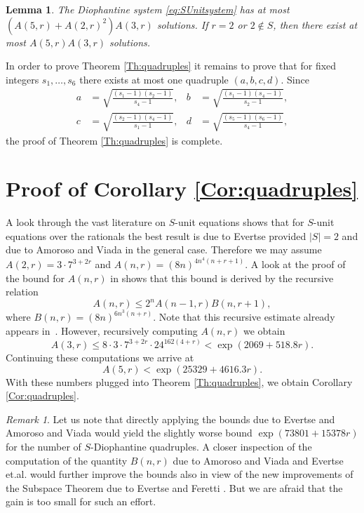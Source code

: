 \documentclass{amsart}
\newtheorem{lemma}{Lemma}
\theoremstyle{remark}
\newtheorem{remark}{Remark}
\begin{document}
\begin{lemma}
The Diophantine system \eqref{eq:SUnitsystem} has at most $(A(5,r)+A(2,r)^2)A(3,r)$ solutions. If $r=2$ or $2\not \in S$, then there exist at most 
$A(5,r)A(3,r)$ solutions.
\end{lemma}

In order to prove Theorem \ref{Th:quadruples} it remains to prove that for fixed integers $s_1,\dots,s_6$ there exists at most one quadruple $(a,b,c,d)$. Since
\begin{align*}
a&=\sqrt{\frac{(s_1-1)(s_2-1)}{s_4-1}},& b&=\sqrt{\frac{(s_1-1)(s_4-1)}{s_2-1}}, \\
c&=\sqrt{\frac{(s_2-1)(s_4-1)}{s_1-1}},& d&=\sqrt{\frac{(s_5-1)(s_6-1)}{s_4-1}},
\end{align*}
the proof of Theorem \ref{Th:quadruples} is complete.

\section{Proof of Corollary \ref{Cor:quadruples}}

A look through the vast literature on $S$-unit equations shows that for $S$-unit equations over the rationals the best result is due to Evertse 
\cite{Evertse:1984a} provided $|S|=2$ and due to Amoroso and Viada \cite{Amoroso:2009} in the general case. Therefore we may assume $A(2,r)=3\cdot7^{3+2r}$ and 
$A(n,r)=(8n)^{4n^4(n+r+1)}$. A look at the 
proof of the bound for $A(n,r)$ in \cite{Amoroso:2009} shows that this bound is derived by the recursive relation
\[A(n,r)\leq 2^n A(n-1,r)B(n,r+1),\]
where $B(n,r)=(8n)^{6n^3(n+r)}$. Note that this recursive estimate already appears in~\cite{Evertse:2002}. However, recursively 
computing $A(n,r)$ we obtain
$$A(3,r)\leq 8\cdot 3\cdot7^{3+2r} \cdot 24^{162(4+r)}< \exp(2069+518.8 r).$$
Continuing these computations we arrive at
$$A(5,r)< \exp(25329+4616.3r).$$
With these numbers plugged into Theorem \ref{Th:quadruples}, we obtain Corollary \ref{Cor:quadruples}.

\begin{remark}
Let us note that directly applying the bounds due to Evertse \cite{Evertse:1984a} and Amoroso and Viada \cite{Amoroso:2009} would yield the slightly worse 
bound $\exp(73801+15378r)$ for the number of $S$-Diophantine quadruples. A closer inspection of the computation of the quantity $B(n,r)$ due to Amoroso and 
Viada \cite{Amoroso:2009} and Evertse et.al. \cite{Evertse:2002} would further improve the bounds also in view of the new improvements of the Subspace Theorem 
due to Evertse and Feretti \cite{Evertse:2013}. But we are afraid that the gain is too small for such an effort. 
\end{remark}
\end{document}
